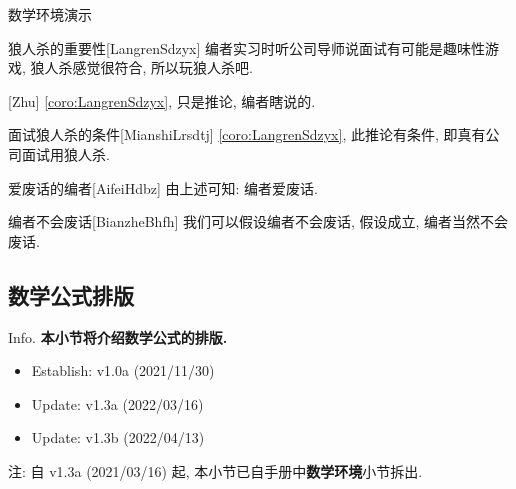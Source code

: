 \documentclass[hyperref, UTF8, CJK, aspectratio=169]{beamer}
\begin{document}
\begin{frame}{数学环境演示}
\begin{scucorollary}{狼人杀的重要性}[LangrenSdzyx]
		编者实习时听公司导师说面试有可能是趣味性游戏, 狼人杀感觉很符合, 所以玩狼人杀吧.
	\end{scucorollary}
	\begin{scuremark}{}[Zhu]
		\vref{coro:LangrenSdzyx}, 只是推论, 编者瞎说的.
	\end{scuremark}
	\begin{scucondition}{面试狼人杀的条件}[MianshiLrsdtj]
		\vref{coro:LangrenSdzyx}, 此推论有条件, 即真有公司面试用狼人杀.
	\end{scucondition}
	\begin{scuconclusion}{爱废话的编者}[AifeiHdbz]
		由上述可知: 编者爱废话.
	\end{scuconclusion}
	\begin{scuassumption}{编者不会废话}[BianzheBhfh]
		我们可以假设编者不会废话, 假设成立, 编者当然不会废话.
	\end{scuassumption}
\end{frame}

\subsection{数学公式排版}
\begin{frame}{Info.}
	\textbf{本小节将介绍数学公式的排版.}
	\begin{multicols}{2}
		\begin{itemize}
			\item Establish: \textcolor{scugreen}{v1.0a (2021/11/30)}
			\item Update: \textcolor{scugreen}{v1.3a (2022/03/16)}
      \item Update: \textcolor{scugreen}{v1.3b (2022/04/13)}
		\end{itemize}
	\end{multicols}
	注: 自 \textcolor{scugreen}{v1.3a (2021/03/16)} 起, 本小节已自手册中\alert{\textbf{数学环境}}小节拆出.\par
	\mycopyright
\end{frame}
\end{document}

